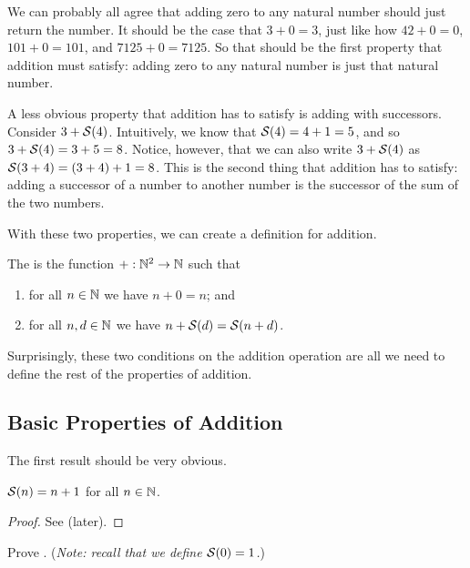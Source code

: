 We can probably all agree that adding zero to any natural number should just return the number. It should be the case that $3 + 0 = 3$, just like how $42 + 0 = 0$, $101 + 0 = 101$, and $7125 + 0 = 7125$. So that should be the first property that addition must satisfy: adding zero to any natural number is just that natural number.

A less obvious property that addition has to satisfy is adding with successors. Consider $3 + {\mathcal{S}(4)}$. Intuitively, we know that ${\mathcal{S}(4)} = 4 + 1 = 5$, and so $3 + {\mathcal{S}(4)} = 3 + 5 = 8$. Notice, however, that we can also write $3 + {\mathcal{S}(4)}$ as ${\mathcal{S}(3 + 4)} = (3 + 4) + 1 = 8$. This is the second thing that addition has to satisfy: adding a successor of a number to another number is the successor of the sum of the two numbers.

With these two properties, we can create a definition for addition.

\begin{definition}
    The  is the function $+: \mathbb{N}^2 \to \mathbb{N}$ such that
    \begin{enumerate}[label=\textbf{A\arabic*.}]
        \item for all $n\in \mathbb{N}$ we have $n + 0 = n$; and
        \item for all $n, d \in \mathbb{N}$ we have $n + {\mathcal{S}(d)} = {\mathcal{S}(n + d)}$.
    \end{enumerate}
\end{definition}

Surprisingly, these two conditions on the addition operation are all we need to define the rest of the properties of addition.

\subsection{Basic Properties of Addition}
The first result should be very obvious.

\begin{proposition}[Successor of $n$]\label{prop:successor-of-n}
    ${\mathcal{S}(n)} = n + 1$ for all $n \in \mathbb{N}$.
\end{proposition}
\begin{proof}
    See  (later).
\end{proof}

\begin{exercise}[Successor of $n$]\label{exercise:successor-of-n}
    Prove .\newline
    (\textit{Note: recall that we define ${\mathcal{S}(0)} = 1$.})
\end{exercise}

